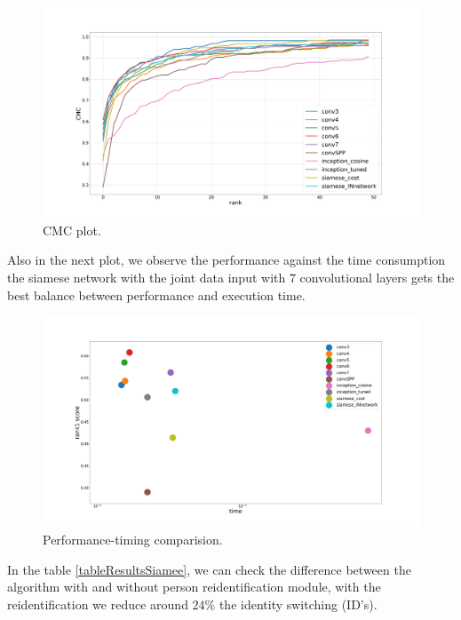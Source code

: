 \begin{figure}[hptb]
\centering         
\includegraphics[width=12cm]{siameseDev/cmc2.png}
\caption{CMC plot.} \label{lossesSiam2}
\end{figure}

Also in the next plot, we observe the performance against the time consumption the siamese network with the joint data input with $7$ convolutional layers gets the best balance between performance and execution time. 

\begin{figure}[hptb]
\centering         
\includegraphics[width=12cm]{siameseDev/graps1.png}
\caption{Performance-timing comparision.} \label{lossesSiam3}
\end{figure}




In the table \ref{tableResultsSiamee}, we can check the difference between the algorithm with and without person reidentification module, with the reidentification we reduce around $24 \%$ the identity switching (ID's).



